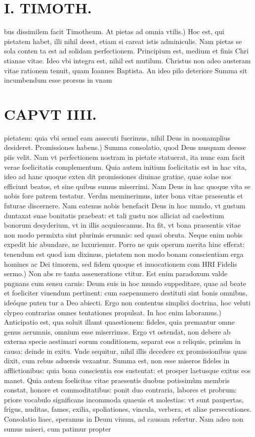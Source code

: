 \documentclass{article}
\begin{document}
\begin{pages}
\section*{I. TIMOTH. }
\marginpar{[ p.50 ]}\pstart bus dissimilem facit Timotheum.  \pend\pstart At pietas ad omnia vtilis.) Hoc est, qui pietatem habet, illi nihil deest, etiam si careat istis adminiculis. Nam pietas se sola conten ta est ad solidam perfectionem. Principium est, medium et finis Chri stianae vitae. Ideo vbi integra est, nihil est mutilum. Christus non adeo austeram vitae rationem tenuit, quam Ioannes Baptista. An ideo pilo deteriore Summa sit incumbendum esse prorsus in vnam  \pend
\section*{CAPVT IIII. }
\marginpar{[ p.51 ]}\pstart pietatem: quia vbi semel eam assecuti fuerimus, nihil Deus in noonamplius desideret.  \pend\pstart Promissiones habens.) Summa consolatio, quod Deus nusquam deesse piis velit. Nam vt perfectionem nostram in pietate statuerat, ita nunc eam facit verae foelicitatis complementum. Quia autem initium foelicitatis est in hac vita, ideo ad hanc quoque exten dit promissiones diuinae gratiae, quae solae nos efficiunt beatos, et sine quibus sumus miserrimi. Nam Deus in hac quoque vita se nobis fore patrem testatur. Verdm meminerimus, inter bona vitae praesentis et futurae discernere. Nam eatenus nobis benefacit Deus in hoc mundo, vt gustum duntaxat suae bonitatis praebeat: et tali gustu nos alliciat ad caelestium bonorum desyderium, vt in illis acquiescamus. Ita fit, vt bona praesentis vitae non modo permixta sint plurimis erumnis: sed quasi obruta. Neque enim nobis expedit hic abundare, ne luxuriemur. Porro ne quis operum merita hinc efferat: tenendum est quod iam diximus, pietatem non modo bonam conscientiam erga homines ac Dei timorem, sed fidem quoque et inuocationem com  \pend\pstart HRI Fidelis sermo.) Non abs re tanta asseueratione vtitur. Est enim paradoxum valde pngnans cum sensu carnis: Deum suis in hoc mundo suppeditare, quae ad beate et foeliciter viuendum pertinent: cum saepenumero destituti sint bonis omnibus, ideóque puten tur a Deo abiecti. Ergo non contentus simplici doctrina, hoc veluti clypeo contrarias omnes tentationes propulsat.  \pend\pstart In hoc enim laboramus.) Anticipatio est, qua soluit illamt quaestionem: fideles, quia premantur omne genus aerumnis, omnium esse miserrimos. Ergo vt ostendat, non debere ab externa specie aestimari eorum conditionem, separat eos a reliquis, primùm in causa: deinde in exitu. Vnde sequitur, nihil illis decedere ex promissionibus quas dixit, cum rebus aduersis vexantur. Summa est, non esse miseros fideles in afflictionibus: quia bona conscientia eos sustentat: et prosper laetusque exitus eos manet. Quia autem foelicitas vitae praesentis duobus potissimùm membris constat, honore et commoditatibus: ponit duo contraria, labores et probrum: priore vocabulo significans incommoda quaeuis et molestias: vt sunt paupertas, frigus, nuditas, fames, exilia, spoliationes, vincula, verbera, et aliae persecutiones. Consolatio liaec, speramus in Deum viuum, ad causam refertur. Nam adeo non sumus miseri, cum patimur propter 
\end{pages}
\end{document}
